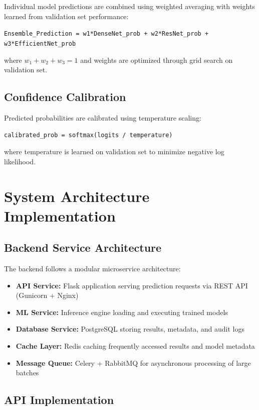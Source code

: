 {Individual model predictions are combined using weighted averaging with weights learned from validation set performance:

\texttt{Ensemble\_Prediction = w1*DenseNet\_prob + w2*ResNet\_prob + w3*EfficientNet\_prob}

where $w_1 + w_2 + w_3 = 1$ and weights are optimized through grid search on validation set.

\subsection{Confidence Calibration}

Predicted probabilities are calibrated using temperature scaling:

\texttt{calibrated\_prob = softmax(logits / temperature)}

where temperature is learned on validation set to minimize negative log likelihood.

\section{System Architecture Implementation}

\subsection{Backend Service Architecture}

The backend follows a modular microservice architecture:

\begin{itemize}
    \item \textbf{API Service:} Flask application serving prediction requests via REST API (Gunicorn + Nginx)
    \item \textbf{ML Service:} Inference engine loading and executing trained models
    \item \textbf{Database Service:} PostgreSQL storing results, metadata, and audit logs
    \item \textbf{Cache Layer:} Redis caching frequently accessed results and model metadata
    \item \textbf{Message Queue:} Celery + RabbitMQ for asynchronous processing of large batches
\end{itemize}

\subsection{API Implementation}

}
